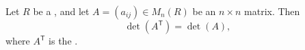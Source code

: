 \begin{proposition} \label{proposition:determinant_of_transpose_equals_determinant_over_a_commutative_ring}
    Let $R$ be a , and let $A = (a_{ij}) \in M_n(R)$ be an $n \times n$ matrix. Then
    $$\det(A^{\mathsf{T}}) = \det(A),$$
    where $A^{\mathsf{T}}$ is the .
\end{proposition}